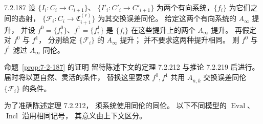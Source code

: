\begin{proposition}{7.2.187}\label{prop:7-2-187}
设 $\{I_i\colon C_i\to C_{i+1}\}$、
$\{I'_i\colon C'_i\to C'_{i+1}\}$
为两个有向系统，$\{f_i\}$ 为它们之间的态射，
$\{\mathcal F_i\colon C_i\to
\mathfrak C_{i+1}^{(r)}\}$
为其交换误差同伦。
给定这两个有向系统的 $A_\infty$ 提升，
并设 $f^0=\{f_i^0\}$、$f^1=\{f_i^1\}$
是 $\{f_i\}$ 在这些提升上的两个
$A_\infty$ 提升。
再假定对 $f^0$ 与 $f^1$，
分别给定 $\{\mathcal F_i\}$
的 $A_\infty$ 提升；
并不要求这两种提升相同。
则 $f^0$ 与 $f^1$ 滤过 $A_\infty$ 同伦。
\end{proposition}

命题~\ref{prop:7-2-187} 的证明
留待陈述下文的定理 7.2.212
与推论 7.2.219 后进行。
届时将以更自然、灵活的条件，
替换这里要求 $f^0,f^1$ 共用
$A_{\bar n,\bar k}$ 交换误差同伦
$\{\mathcal F_i\}$ 的条件。

为了准确陈述定理 7.2.212，
须系统使用同伦的同伦。
以下不同模型的 $\operatorname{Eval}$、
$\operatorname{Incl}$ 沿用相同记号，
其意义由上下文区分。

